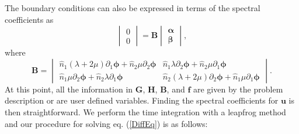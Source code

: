 \documentclass[12pt]{article}
\begin{document}
The boundary conditions can also be expressed in terms of the spectral
coefficients as
\begin{equation}
\begin{vmatrix}
  0\\
  0
\end{vmatrix} =
\boldsymbol{B}
\begin{vmatrix}
  \boldsymbol{\alpha}\\
  \boldsymbol{\beta}
\end{vmatrix},
\end{equation}
where
\begin{equation}
\boldsymbol{B} = 
\begin{vmatrix}
 \hat{n}_1(\lambda + 2\mu)\partial_1 \boldsymbol{\phi} +  
 \hat{n}_2\mu\partial_2 \boldsymbol{\phi} &
 \hat{n}_1\lambda\partial_2 \boldsymbol{\phi} +  
 \hat{n}_2\mu\partial_1 \boldsymbol{\phi}\\
 \hat{n}_1\mu\partial_2 \boldsymbol{\phi} +  
 \hat{n}_2\lambda\partial_1 \boldsymbol{\phi} &
 \hat{n}_2(\lambda + 2\mu)\partial_2 \boldsymbol{\phi} +  
 \hat{n}_1\mu\partial_1 \boldsymbol{\phi}
\end{vmatrix}.
\end{equation}
At this point, all the information in $\boldsymbol{G}$,
$\boldsymbol{H}$, $\boldsymbol{B}$, and $\boldsymbol{f}$ are given by
the problem description or are user defined variables.  Finding the
spectral coefficients for $\boldsymbol{u}$ is then straightforward.
We perform the time integration with a leapfrog method and our
procedure for solving eq. (\ref{DiffEq}) is as follows:
\end{document}
